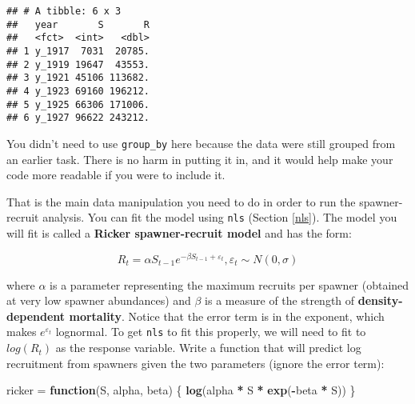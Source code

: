 \documentclass[]{book}
\newenvironment{Shaded}{\begin{snugshade}}{\end{snugshade}}
\newcommand{\KeywordTok}[1]{\textcolor[rgb]{0.13,0.29,0.53}{\textbf{#1}}}
\newcommand{\DataTypeTok}[1]{\textcolor[rgb]{0.13,0.29,0.53}{#1}}
\newcommand{\StringTok}[1]{\textcolor[rgb]{0.31,0.60,0.02}{#1}}
\newcommand{\ControlFlowTok}[1]{\textcolor[rgb]{0.13,0.29,0.53}{\textbf{#1}}}
\newcommand{\OperatorTok}[1]{\textcolor[rgb]{0.81,0.36,0.00}{\textbf{#1}}}
\newcommand{\NormalTok}[1]{#1}
\theoremstyle{definition}
\theoremstyle{definition}
\theoremstyle{definition}
\theoremstyle{remark}
\begin{document}
\begin{Shaded}
\end{Shaded}

\begin{verbatim}
## # A tibble: 6 x 3
##   year       S       R
##   <fct>  <int>   <dbl>
## 1 y_1917  7031  20785.
## 2 y_1919 19647  43553.
## 3 y_1921 45106 113682.
## 4 y_1923 69160 196212.
## 5 y_1925 66306 171006.
## 6 y_1927 96622 243212.
\end{verbatim}

You didn't need to use \texttt{group\_by} here because the data were
still grouped from an earlier task. There is no harm in putting it in,
and it would help make your code more readable if you were to include
it.

That is the main data manipulation you need to do in order to run the
spawner-recruit analysis. You can fit the model using \texttt{nls}
(Section \ref{nls}). The model you will fit is called a \textbf{Ricker
spawner-recruit model} and has the form:

\begin{equation}
  R_t = \alpha S_{t-1} e^{-\beta S_{t-1} + \varepsilon_t} ,\varepsilon_t \sim N(0,\sigma)
\label{eq:ricker-ch5}
\end{equation}

where \(\alpha\) is a parameter representing the maximum recruits per
spawner (obtained at very low spawner abundances) and \(\beta\) is a
measure of the strength of \textbf{density-dependent mortality}. Notice
that the error term is in the exponent, which makes
\(e^{\varepsilon_t}\) lognormal. To get \texttt{nls} to fit this
properly, we will need to fit to \(log(R_t)\) as the response variable.
Write a function that will predict log recruitment from spawners given
the two parameters (ignore the error term):

\begin{Shaded}
\begin{Highlighting}[]
\NormalTok{ricker =}\StringTok{ }\ControlFlowTok{function}\NormalTok{(S, alpha, beta) \{}
  \KeywordTok{log}\NormalTok{(alpha }\OperatorTok{*}\StringTok{ }\NormalTok{S }\OperatorTok{*}\StringTok{ }\KeywordTok{exp}\NormalTok{(}\OperatorTok{-}\NormalTok{beta }\OperatorTok{*}\StringTok{ }\NormalTok{S))}
\NormalTok{\}}
\end{Highlighting}
\end{Shaded}
\end{document}
